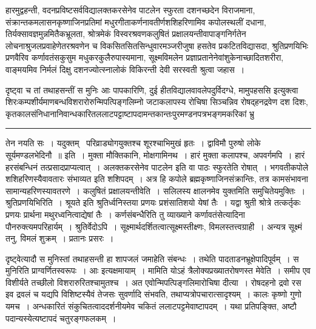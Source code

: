 \documentclass[11pt, openany]{book}
\begin{document}
\noindent
हारमुद्वहन्ती, वदनप्रविष्टसर्वविद्यालक्तकरसेनेव पाटलेन स्फुरता दशनच्छदेन विराजमाना, संक्रान्तकमलासनकृष्णाजिनप्रतिमां मधुरगीताकर्णनावतीर्णशशिहरिणामिव कपोलस्थलीं दधाना, तिर्यक्सावज्ञमुन्नमितैकभ्रूलता, श्रोत्रमेकं विस्वरश्रवणकलुषितं प्रक्षालयन्तीवापाङ्गनिर्गतेन लोचनाश्रुजलप्रवाहेणेतरश्रवणेन च विकसितसितसिन्धुवारमञ्जरीजुषा हसतेव प्रकटितविद्यासदा, श्रुतिप्रणयिभिः प्रणवैरिव कर्णावतंसकुसुम मधुकरकुलैरुपास्यमाना, सूक्ष्मविमलेन प्रज्ञाप्रतानेनेवांशुकेनाच्छादितशरीरा, वाङ्मयमिव निर्मलं दिक्षु दशनज्योत्स्नालोकं विकिरन्ती देवी सरस्वती श्रुत्वा जहास~।

दृष्ट्वा च तां तथाहसन्तीं स मुनिः {\haq आः पापकारिणि, दुई हीतविद्यालवावलेपदुर्विदग्धे, मामुपहससि} इत्युक्त्वा शिरःकम्पशीर्यमाणबन्धविशरारोरुन्मिपत्पिङ्गलिम्नो जटाकलापस्य रोचिषा सिञ्चन्निव रोषद्हनद्रवेण दश दिशः, कृतकालसंनिधानानिवान्धकारितललाटपट्टाष्टापदामन्तकान्तःपुरमण्डनपत्रभङ्गमकरिकां भ्रु\textendash

\vspace{2mm}
\hrule

\noindent
{\s तेन नयति सः~। यदुक्तम् \textendash\ {\qt परिव्राड्योगयुक्तश्च शूरश्चाभिमुखं हृतः~। द्वाविमौ पुरुषो लोके सूर्यमण्डलभेदिनौ~॥} इति~। मुक्ता मौक्तिकानि, मोक्षगामिनथ~। हारं मुक्ता कलापश्च, अपवर्गमपि~। हारं हरसंबन्धिनं तत्प्रसादप्राप्यत्वात्~। {\qt अलक्तकरसेनेव पाटलेन} इति वा पाठः स्फुरतेति रोषात्~। भगवतीकपोले शशिहरिणस्यैवावतारः संभाव्यत इति शशिपदम्~। अत्र हि कपोले ब्रह्मकृष्णाजिनसंक्रान्तिः, तत्र कामसंभावना सामान्यहरिणस्यावतरणे~। {\qtt कलुषितं प्रक्षालयन्तीवेति}~। सलिलस्य क्षालनमेव युक्तमिति समुचितेयमुक्तिः~। {\qtt श्रुतिप्रणयिभिरिति}~। श्रूयते इति श्रुतिर्ध्वनिस्तया प्रणयः प्रशंसातिशयो येषां तैः~। यद्वा श्रुती श्रोत्रे तत्कर्तृकः प्रणयः प्रार्थना मथुरध्वनित्वाद्येषां तैः~। कर्णसंबन्धैरिति तु व्याख्याने कर्णावतंसेत्यादिना पौनरुक्त्यमपरिहार्यम्~। श्रुतिर्वेदोऽपि~। सूक्ष्मार्थदर्शितत्वात्सूक्ष्मस्तीक्ष्णः, विमलस्तत्त्वग्राही~। अन्यत्र सूक्ष्मं तनु, विमलं शुक्रम्~। प्रतानः प्रसरः~।

दृष्ट्वेत्यादौ स मुनिस्तां तथाहसन्ती हा शापजलं जमाहेति संबन्धः~। तथेति पादताडनभ्रूक्षेपादिपूर्वम्~। स मुनिरिति प्राग्वर्णितस्वरूपः~। आः इत्यक्षमायाम्~। मामिति योऽहं त्रैलोक्यप्रख्यातरोषणस्त मेवेति~। समीप एव विशीर्यते तच्छीलो विशरारुरितश्चामुतश्च~। अत एवोन्मिपत्पिङ्गलिमारोचिषा दीत्या~। रोषदहनो द्रवो रस इव द्रवलं च यद्यपि विशिष्टस्यैवं तेजसः सुवर्णादि संभवति, तथाप्यत्रोपचारात्सादृश्यम्~। कालः कृष्णो गुणो यमच~। अन्धकारितं संकुचितत्वाददर्शनीयमेव चकितं ललाटपट्टमेवाष्टापदम्~। यथा प्रतिपङ्क्ति, अष्टौ पदान्यस्येत्यष्टापदं चतुरङ्गफलकम्~।}

\end{document}
